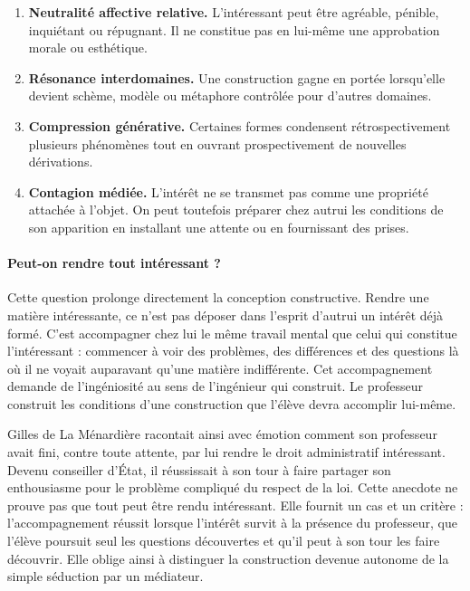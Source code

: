 \documentclass[11pt,a4paper]{article}
\begin{document}
\begin{enumerate}[resume]
  \item \textbf{Neutralité affective relative.} L'intéressant peut être
        agréable, pénible, inquiétant ou répugnant. Il ne constitue pas en
        lui-même une approbation morale ou esthétique.
  \item \textbf{Résonance interdomaines.} Une construction gagne en portée
        lorsqu'elle devient schème, modèle ou métaphore contrôlée pour d'autres
        domaines.
  \item \textbf{Compression générative.} Certaines formes condensent
        rétrospectivement plusieurs phénomènes tout en ouvrant prospectivement
        de nouvelles dérivations.
  \item \textbf{Contagion médiée.} L'intérêt ne se transmet pas comme une
        propriété attachée à l'objet. On peut toutefois préparer chez autrui les
        conditions de son apparition en installant une attente ou en fournissant
        des prises.
\end{enumerate}

\paragraph{Peut-on rendre tout intéressant ?}

Cette question prolonge directement la conception constructive. Rendre une
matière intéressante, ce n'est pas déposer dans l'esprit d'autrui un intérêt
déjà formé. C'est accompagner chez lui le même travail mental que celui qui
constitue l'intéressant : commencer à voir des problèmes, des différences et
des questions là où il ne voyait auparavant qu'une matière indifférente. Cet
accompagnement demande de l'ingéniosité au sens de l'ingénieur qui construit.
Le professeur construit les conditions d'une construction que l'élève devra
accomplir lui-même.

Gilles de La Ménardière racontait ainsi avec émotion comment son professeur
avait fini, contre toute attente, par lui rendre le droit administratif
intéressant. Devenu conseiller d'État, il réussissait à son tour à faire
partager son enthousiasme pour le problème compliqué du respect de la loi.
Cette anecdote ne prouve pas que tout peut être rendu intéressant. Elle fournit
un cas et un critère : l'accompagnement réussit lorsque l'intérêt survit à la
présence du professeur, que l'élève poursuit seul les questions découvertes et
qu'il peut à son tour les faire découvrir. Elle oblige ainsi à distinguer la
construction devenue autonome de la simple séduction par un médiateur.
\end{document}

